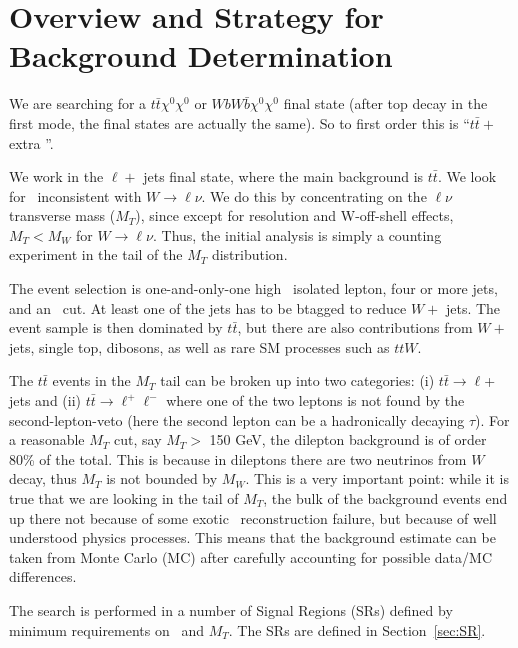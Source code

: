 \section{Overview and Strategy for Background Determination}
\label{sec:overview}

We are searching for a $t\bar{t}\chi^0\chi^0$ or $W b W \bar{b} \chi^0 \chi^0$ final state
(after top decay in the first mode, the final states are actually the same).  So to first order 
this is ``$t\bar{t} +$ extra \met''.  

We work in the $\ell +$ jets final state, where the main background is $t\bar{t}$.  We look for 
\met\ inconsistent with $W \to \ell \nu$.  We do this by concentrating on the $\ell \nu$ transverse
mass ($M_T$), since except for resolution and W-off-shell effects, $M_T < M_W$ for $W \to \ell \nu$.  Thus, the
initial analysis is simply a counting experiment in the tail of the $M_T$ distribution.  

The event selection is one-and-only-one high \pt\ isolated lepton, four or more jets, and
an \met\ cut.  At least one of the jets has to be btagged to reduce $W+$ jets.
The event sample is then dominated by $t\bar{t}$, but there are also contributions from $W+$ jets,
single top, dibosons, as well as rare SM processes such as $ttW$.


The $t\bar{t}$ events in the $M_T$ tail can be broken up into two categories: 
(i) $t\bar{t} \to \ell $+ jets and (ii) $t\bar{t} \to \ell^+ \ell^-$ where one of the two
leptons is not found by the second-lepton-veto (here the second lepton can be a hadronically
decaying $\tau$).
 For a reasonable $M_T$ cut, say $M_T >$ 150 GeV, the dilepton background is of order 80\% of 
the total.  This is because in dileptons there are two neutrinos from $W$ decay, thus $M_T$
is not bounded by $M_W$.  This is a very important point: while it is true that we are looking in
the tail of $M_T$, the bulk of the background events end up there not because of some exotic
\met\ reconstruction failure, but because of well understood physics processes.  This means that 
the background estimate can be taken from Monte Carlo (MC) 
after carefully accounting for possible
data/MC differences.   

The search is performed in a number of Signal Regions (SRs) defined 
by minimum requirements on \met\  and $M_T$.  The SRs
are defined in Section~\ref{sec:SR}.

